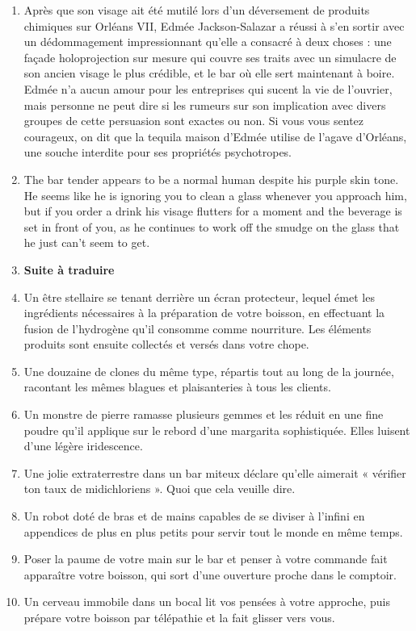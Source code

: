 \documentclass{article}
\begin{document}
\begin{enumerate}
	\item Après que son visage ait été mutilé lors d'un déversement de produits chimiques sur Orléans VII, Edmée Jackson-Salazar a réussi à s'en sortir avec un dédommagement impressionnant qu'elle a consacré à deux choses : une façade holoprojection sur mesure qui couvre ses traits avec un simulacre de son ancien visage le plus crédible, et le bar où elle sert maintenant à boire. Edmée n'a aucun amour pour les entreprises qui sucent la vie de l'ouvrier, mais personne ne peut dire si les rumeurs sur son implication avec divers groupes de cette persuasion sont exactes ou non. Si vous vous sentez courageux, on dit que la tequila maison d'Edmée utilise de l'agave d'Orléans, une souche interdite pour ses propriétés psychotropes.\item The bar tender appears to be a normal human despite his purple skin tone. He seems like he is ignoring you to clean a glass whenever you approach him, but if you order a drink his visage flutters for a moment and the beverage is set in front of you, as he continues to work off the smudge on the glass that he just can't seem to get.
	\item \textbf{Suite à traduire}
	\item Un être stellaire se tenant derrière un écran protecteur, lequel émet les ingrédients nécessaires à la préparation de votre boisson, en effectuant la fusion de l’hydrogène qu’il consomme comme nourriture. Les éléments produits sont ensuite collectés et versés dans votre chope.
	\item Une douzaine de clones du même type, répartis tout au long de la journée, racontant les mêmes blagues et plaisanteries à tous les clients.
	\item Un monstre de pierre ramasse plusieurs gemmes et les réduit en une fine poudre qu’il applique sur le rebord d’une margarita sophistiquée. Elles luisent d’une légère iridescence.
	\item Une jolie extraterrestre dans un bar miteux déclare qu’elle aimerait « vérifier ton taux de midichloriens ». Quoi que cela veuille dire.
	\item Un robot doté de bras et de mains capables de se diviser à l’infini en appendices de plus en plus petits pour servir tout le monde en même temps.
	\item Poser la paume de votre main sur le bar et penser à votre commande fait apparaître votre boisson, qui sort d’une ouverture proche dans le comptoir.
	\item Un cerveau immobile dans un bocal lit vos pensées à votre approche, puis prépare votre boisson par télépathie et la fait glisser vers vous.

\end{enumerate}
\end{document}
